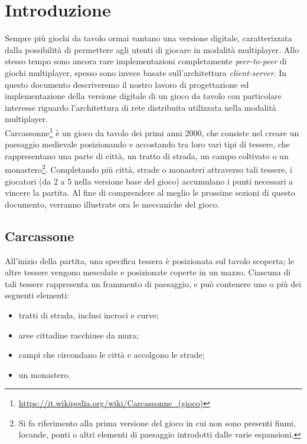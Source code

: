 \section{Introduzione}
Sempre più giochi da tavolo ormai vantano una versione digitale,
caratterizzata dalla possibilità di permettere agli utenti di giocare in
modalità multiplayer.
Allo stesso tempo sono ancora rare implementazioni completamente \emph{peer-to-peer} di
giochi multiplayer, spesso sono invece basate sull'architettura
\emph{client-server}. In questo documento descriveremo il nostro lavoro di
progettazione ed implementazione della versione digitale di un gioco da
tavolo con particolare interesse riguardo l'architettura di rete
distribuita utilizzata nella modalità multiplayer. \\

Carcassonne\footnote{\url{https://it.wikipedia.org/wiki/Carcassonne_(gioco)}} è un gioco da tavolo dei
primi anni 2000, che consiste nel creare un paesaggio medievale 
posizionando e accostando tra loro vari tipi di tessere, che rappresentano una parte di città, 
un tratto di strada, un campo coltivato o un monastero\footnote{Si fa riferimento
alla prima versione del gioco in cui non sono presenti fiumi, locande,
ponti o altri elementi di paesaggio introdotti dalle varie espansioni.}.
Completando più città, strade o monasteri attraverso tali tessere, i
giocatori (da 2 a 5 nella versione base del gioco) accumulano i punti necessari a vincere la partita.
Al fine di comprendere al meglio le prossime sezioni di questo documento, 
verranno illustrate ora le meccaniche del gioco.

\subsection{Carcassone}
All'inizio della partita, una specifica tessera è posizionata sul tavolo scoperta; 
le altre tessere vengono mescolate e posizionate coperte in un mazzo.
Ciascuna di tali tessere rappresenta un frammento di paesaggio, e può contenere uno o più dei seguenti elementi:

\begin{itemize}
	\item tratti di strada, inclusi incroci e curve;
    \item aree cittadine racchiuse da mura;
    \item campi che circondano le città e accolgono le strade;
    \item un monastero.
\end{itemize}


